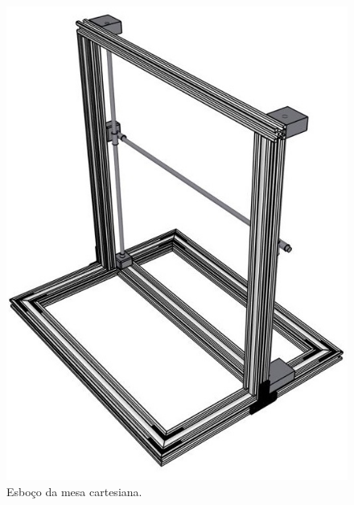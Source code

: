 \begin{figure}[H]
\centering
\caption{Esboço da mesa cartesiana.}\label{fig:estruturamesa}
\includegraphics[scale = 1]{figuras/estruturamesa}
\end{figure}

